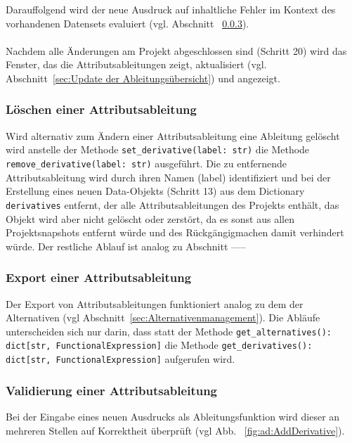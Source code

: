 \documentclass{article}
\begin{document}
Darauffolgend wird der neue Ausdruck auf inhaltliche Fehler im Kontext des vorhandenen Datensets evaluiert (vgl. Abschnitt ~\ref{sec:Validierung einer Attributsableitung}).\\\\
Nachdem alle Änderungen am Projekt abgeschlossen sind (Schritt 20) wird das Fenster, das die Attributsableitungen zeigt, aktualisiert (vgl. Abschnitt~\ref{sec:Update der Ableitungsübersicht}) und angezeigt.


\subsubsection{Löschen einer Attributsableitung}
Wird alternativ zum Ändern einer Attributsableitung eine Ableitung gelöscht wird anstelle der Methode \texttt{set\_derivative(label: str)} die Methode \texttt{remove\_derivative(label: str)} ausgeführt. Die zu entfernende Attributsableitung wird durch ihren Namen (label) identifiziert und bei der Erstellung eines neuen Data-Objekts (Schritt 13) aus dem Dictionary \texttt{derivatives} entfernt, der alle Attributsableitungen des Projekts enthält, das Objekt wird aber nicht gelöscht oder zerstört, da es sonst aus allen Projektsnapshots entfernt würde und des Rückgängigmachen damit verhindert würde. Der restliche Ablauf ist analog zu Abschnitt -----

\subsubsection{Export einer Attributsableitung} 
Der Export von Attributsableitungen funktioniert analog zu dem der Alternativen (vgl Abschnitt~\ref{sec:Alternativenmanagement}). Die Abläufe unterscheiden sich nur darin, dass statt der Methode \texttt{get\_alternatives(): dict[str, FunctionalExpression]} die Methode \texttt{get\_derivatives(): dict[str, FunctionalExpression]} aufgerufen wird.


\subsubsection{Validierung einer Attributsableitung}\label{sec:Validierung einer Attributsableitung}

Bei der Eingabe eines neuen Ausdrucks als Ableitungsfunktion wird dieser an mehreren Stellen auf Korrektheit überprüft (vgl Abb. ~\ref{fig:ad:AddDerivative}). 
\end{document}
